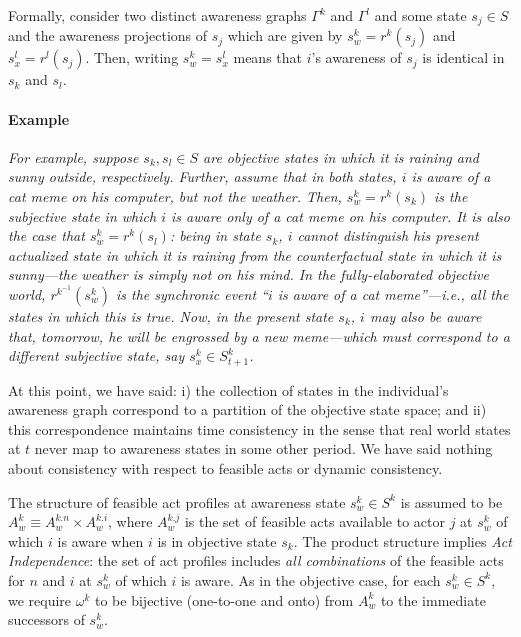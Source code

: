 \documentclass[
11pt,
titlepage,
reqno,
]{article}%
\theoremstyle{definition}
\begin{document}
Formally, consider two distinct awareness graphs $\Gamma^k$ and $\Gamma^{l}$ and some state $s_{j}\in S$ and the awareness projections of $s_j$ which are given by $s^{k}_w=r^{k}(s_j)$ and $s^{l}_x=r^{l}(s_j)$.
Then, writing $s^{k}_w=s^{l}_x$ means that $i$'s awareness of $s_j$ is identical in $s_k$ and $s_l$.


\paragraph{Example}
\emph
{
	For example, suppose $s_k,s_l\in S$ are objective states in which it is raining and sunny outside, respectively.
Further, assume that in both states,  $i$ is aware of a cat meme on his computer, but not the weather. 
Then, $s^{k}_w=r^k(s_k)$ is the subjective state in which $i$ is aware only of a cat meme on his computer.
It is also the case that $s^{k}_w=r^k(s_l)$: being in state $s_k$, $i$ cannot distinguish his present actualized  state in which it is raining from the counterfactual state in which it is sunny---the weather is simply not on his mind.
In the fully-elaborated objective world, $r^{k^{-1}}(s^{k}_w)$ is the synchronic event ``$i$ is aware of a cat meme''---i.e., all the states in which this is true.
Now, in the present state $s_k$, $i$ may also be aware that, tomorrow, he will be engrossed by a new meme---which must correspond to a different subjective state, say $s^{k}_x\in S^k_{t+1}$.
}
 
At this point, we have said: i) the collection of states in the individual's awareness graph correspond to a partition of the objective state space; and ii)  this correspondence maintains time consistency in the sense that real world states at $t$ never map to awareness states in some other period. We have said nothing about consistency with respect to feasible acts or dynamic consistency. 

The structure of feasible act profiles at awareness state $s^k_w\in S^k$ is assumed to be $A^k_{w}\equiv A^{k.n}_{w}\times A^{k.i}_{w}$, where $A^{k.j}_{w}$ is the set of feasible acts available to actor $j$ at $s^k_w$ of which $i$ is aware when $i$ is in objective state $s_k$.
The product structure implies \textit{Act Independence}:  the set of act profiles includes \textit{all combinations} of the feasible acts for $n$ and $i$ at $s^k_w$ of which $i$ is aware. 
As in the objective case, for each $s^k_w\in S^k$, we require $\omega^k$ to be bijective (one-to-one and onto) from $A^k_{w}$ to the immediate successors of $s^k_w$.
\end{document}
